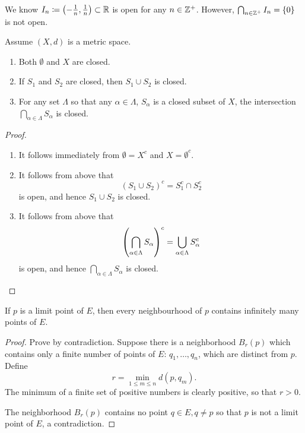 \begin{example}
We know $I_n\coloneqq\left(-\frac{1}{n},\frac{1}{n}\right)\subset\mathbb R$ is open for any $n\in\mathbb Z^+$. However, $\bigcap_{n\in\mathbb Z^+}I_n=\{0\}$ is not open.
\end{example}

\begin{proposition}
Assume $(X,d)$ is a metric space.
\begin{enumerate}[label=(\arabic*)]
\item Both $\emptyset$ and $X$ are closed.
\item If $S_1$ and $S_2$ are closed, then $S_1\cup S_2$ is closed.
\item For any set $\Lambda$ so that any $\alpha\in\Lambda$, $S_\alpha$ is a closed subset of $X$, the intersection $\bigcap_{\alpha\in\Lambda}S_\alpha$ is closed.
\end{enumerate}
\end{proposition}

\begin{proof} \
\begin{enumerate}[label=(\arabic*)]
\item It follows immediately from $\emptyset=X^c$ and $X=\emptyset^c$.
\item It follows from above that
\[ (S_1\cup S_2)^c=S_1^c\cap S_2^c \]
is open, and hence $S_1\cup S_2$ is closed.
\item It follows from above that
\[ \left(\bigcap_{\alpha\in\Lambda}S_\alpha\right)^c=\bigcup_{\alpha\in\Lambda}S_\alpha^c \]
is open, and hence $\bigcap_{\alpha\in\Lambda}S_\alpha$ is closed.
\end{enumerate}
\end{proof}

\begin{proposition}
If $p$ is a limit point of $E$, then every neighbourhood of $p$ contains infinitely many points of $E$.
\end{proposition}

\begin{proof}
Prove by contradiction. Suppose there is a neighborhood $B_r(p)$ which contains only a finite number of points of $E$: $q_1,\dots,q_n$, which are distinct from $p$. Define
\[ r=\min_{1\le m\le n} d(p,q_m). \]
The minimum of a finite set of positive numbers is clearly positive, so that $r>0$.

The neighborhood $B_r(p)$ contains no point $q\in E,q\neq p$ so that $p$ is not a limit point of $E$, a contradiction.
\end{proof}

